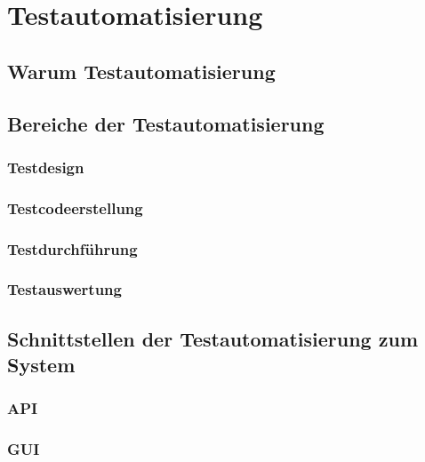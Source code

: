 \chapter{Testautomatisierung}
\label{sec:testautomatisierung}


\section{Warum Testautomatisierung}
\label{sec:warum_testautomatisierung}



\section{Bereiche der Testautomatisierung}
\label{sec:bereiche_der_estautomatisierung}



\subsection{Testdesign}
\label{subsec:testdesign}


\subsection{Testcodeerstellung}
\label{subsec:testcodeerstellung}


\subsection{Testdurchführung}
\label{subsec:testdurchführung}


\subsection{Testauswertung}
\label{subsec:testauswertung}



\section{Schnittstellen der Testautomatisierung zum System}
\label{sec:schnittstellen_der_testautomatisierung_zum_syste}


\subsection{API}


\subsection{GUI}

